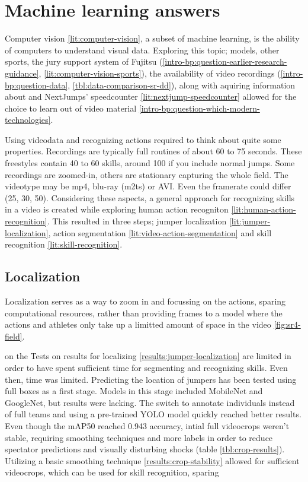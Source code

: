 \section{Machine learning answers}
\label{ch:machine-learning-answers}

Computer vision \ref{lit:computer-vision}, a subset of machine learning, is the ability of computers to understand visual data.
Exploring this topic; models, other sports, the jury support system of Fujitsu (\ref{intro-bp:question-earlier-research-guidance}, \ref{lit:computer-vision-sports}), the availability of video recordings (\ref{intro-bp:question-data}, \ref{tbl:data-comparison-sr-dd}), along with aquiring information about and NextJumps' speedcounter \ref{lit:nextjump-speedcounter} allowed for the choice to learn out of video material \ref{intro-bp:question-which-modern-technologies}.

Using videodata and recognizing actions required to think about quite some properties. Recordings are typically full routines of about 60 to 75 seconds. These freestyles contain 40 to 60 skills, around 100 if you include normal jumps. Some recordings are zoomed-in, others are stationary capturing the whole field. The videotype may be mp4, blu-ray (m2ts) or AVI. Even the framerate could differ (25, 30, 50).
Considering these aspects, a general approach for recognizing skills in a video is created while exploring human action recogniton \ref{lit:human-action-recognition}. This resulted in three steps; jumper localization \ref{lit:jumper-localization}, action segmentation \ref{lit:video-action-segmentation} and skill recognition \ref{lit:skill-recognition}.


\subsection{Localization}

Localization serves as a way to zoom in and focussing on the actions, sparing computational resources, rather than providing frames to a model where the actions and athletes only take up a limitted amount of space in the video \ref{fig:sr4-field}.

on the  Tests on results for localizing \ref{results:jumper-localization} are limited in order to have spent sufficient time for segmenting and recognizing skills. Even then, time was limited. Predicting the location of jumpers has been tested using full boxes as a first stage. Models in this stage included MobileNet and GoogleNet, but results were lacking. The switch to annotate individuals instead of full teams and using a pre-trained YOLO model quickly reached better results. Even though the mAP50 reached 0.943 accuracy, intial full videocrops weren't stable, requiring smoothing techniques and more labels in order to reduce spectator predictions and visually disturbing shocks (table \ref{tbl:crop-results}). Utilizing a basic smoothing technique \ref{results:crop-stability} allowed for sufficient videocrops, which can be used for skill recognition, sparing 

